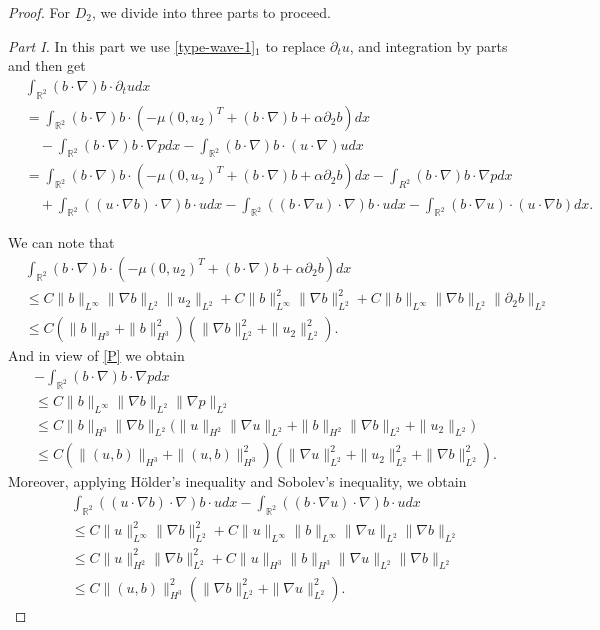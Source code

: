 \documentclass[10pt,a4paper]{amsart}
\def\R{\mathbb R}
\begin{document}
\begin{proof}
 For $D_{2}$, we divide into three parts to proceed.


 {\it {Part I.}} In this part we  use \eqref{type-wave-1}$_1$ to replace $\partial_tu$, and integration by parts and then get
\begin{align}\label{diff decom-1}
&\int_{\R^2}(b\cdot \nabla)b\cdot \partial_tudx\nonumber\\
&=\int_{\R^2}(b\cdot\nabla) b\cdot(-\mu (0,u_2)^{T}  +(b \cdot \nabla) b+\alpha\partial_2 b)dx
\nonumber\\
&\quad-\int_{\R^2}(b\cdot\nabla) b\cdot\nabla pdx-\int_{\R^2}(b\cdot\nabla) b\cdot (u\cdot\nabla) udx
\nonumber\\
&=\int_{\R^2}(b\cdot\nabla) b\cdot(-\mu (0,u_2)^{T} +(b \cdot \nabla) b+\alpha\partial_2 b)dx-\int_{R^2}(b\cdot\nabla) b\cdot\nabla pdx
\nonumber\\
&\quad+\int_{\R^2}((u\cdot \nabla b)\cdot \nabla)b\cdot udx-\int_{\R^2}((b\cdot \nabla u)\cdot \nabla)b\cdot u dx-\int_{\R^2}(b\cdot \nabla u)\cdot(u\cdot \nabla b)dx.
\end{align}

We can note that
\begin{align}\label{D21}
&\int_{\R^2}(b\cdot\nabla) b\cdot(-\mu (0,u_2)^{T}  +(b \cdot \nabla) b+\alpha\partial_2 b)dx\nonumber\\&
\leq
C\|b\|_{L^\infty}\|\nabla b\|_{L^2}\|u_2\|_{L^2}+C\|b\|_{L^\infty}^2\|\nabla b\|_{L^2}^2+C\|b\|_{L^\infty}\|\nabla b\|_{L^2}\|\partial_2b\|_{L^2}\nonumber\\
&\leq C\left(\|b\|_{H^3}+\|b\|_{H^3}^2\right)\left(\|\nabla b\|_{L^2}^2+\|u_2\|_{L^2}^2\right).
\end{align}
And in view of \eqref{P} we obtain
\begin{align}\label{D22}
&-\int_{\R^2}(b\cdot\nabla) b\cdot\nabla pdx
\nonumber\\&\leq
C\|b\|_{L^\infty}\|\nabla b\|_{L^2}\|\nabla p\|_{L^2}\nonumber\\
&\leq C\|b\|_{H^3}\|\nabla b\|_{L^2}\Big(\|u\|_{H^2}\|\nabla u\|_{L^{2}}+\|b\|_{H^2}\|\nabla b\|_{L^{2}}+\|u_2\|_{L^2}\Big)\nonumber\\
&\leq C\left(\|(u,b)\|_{H^3}+\|(u,b)\|_{H^3}^2\right)\left(\|\nabla u\|_{L^{2}}^2+\|u_2\|_{L^2}^2+\|\nabla b\|_{L^2}^2\right).
\end{align}
Moreover, applying H\"{o}lder's inequality and Sobolev's inequality, we obtain
\begin{align}\label{D23-1}
&\int_{\R^2}((u\cdot \nabla b)\cdot \nabla)b\cdot udx-\int_{\R^2}((b\cdot \nabla u)\cdot \nabla)b\cdot u dx
\nonumber\\ &\leq
C\|u\|_{L^\infty}^2\|\nabla b\|_{L^2}^2+C\|u\|_{L^\infty}\|b\|_{L^\infty}\|\nabla u\|_{L^2}\|\nabla b\|_{L^2}\nonumber\\
&\leq C\|u\|_{H^2}^2\|\nabla b\|_{L^2}^2+C\|u\|_{H^3}\|b\|_{H^3}\|\nabla u\|_{L^2}\|\nabla b\|_{L^2}\nonumber\\
&\leq C\|(u,b)\|_{H^3}^2\left(\|\nabla b\|_{L^2}^2+\|\nabla u\|_{L^2}^2\right).
\end{align}



\end{proof}
\end{document}
